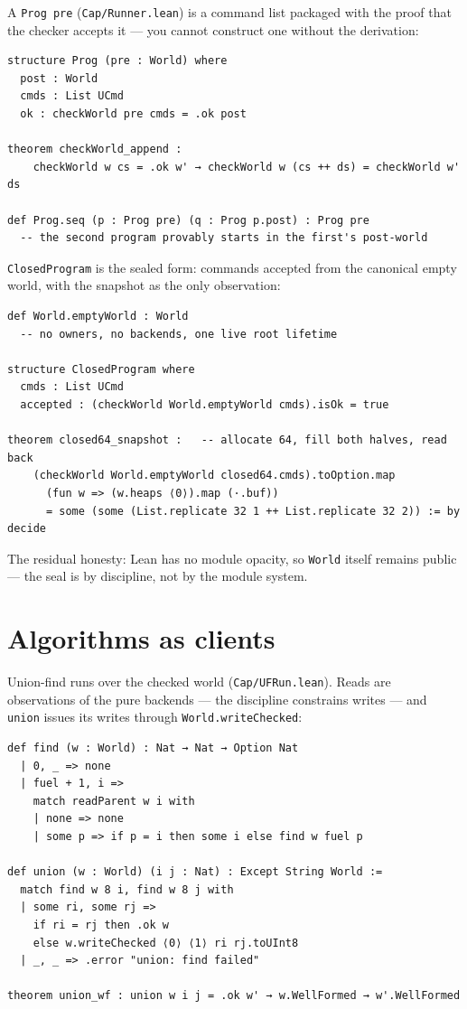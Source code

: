 \documentclass[10pt,a4paper]{article}
\newcommand{\file}[1]{\texttt{#1}}
\newcommand{\lean}[1]{\texttt{#1}}
\begin{document}
A \lean{Prog pre} (\file{Cap/Runner.lean}) is a command list packaged with the
proof that the checker accepts it --- you cannot construct one without the
derivation:

\begin{lstlisting}
structure Prog (pre : World) where
  post : World
  cmds : List UCmd
  ok : checkWorld pre cmds = .ok post

theorem checkWorld_append :
    checkWorld w cs = .ok w' → checkWorld w (cs ++ ds) = checkWorld w' ds

def Prog.seq (p : Prog pre) (q : Prog p.post) : Prog pre
  -- the second program provably starts in the first's post-world
\end{lstlisting}

\lean{ClosedProgram} is the sealed form: commands accepted from the canonical
empty world, with the snapshot as the only observation:

\begin{lstlisting}
def World.emptyWorld : World
  -- no owners, no backends, one live root lifetime

structure ClosedProgram where
  cmds : List UCmd
  accepted : (checkWorld World.emptyWorld cmds).isOk = true

theorem closed64_snapshot :   -- allocate 64, fill both halves, read back
    (checkWorld World.emptyWorld closed64.cmds).toOption.map
      (fun w => (w.heaps ⟨0⟩).map (·.buf))
      = some (some (List.replicate 32 1 ++ List.replicate 32 2)) := by decide
\end{lstlisting}

The residual honesty: Lean has no module opacity, so \lean{World} itself remains
public --- the seal is by discipline, not by the module system.

\section{Algorithms as clients}

Union-find runs over the checked world (\file{Cap/UFRun.lean}). Reads are
observations of the pure backends --- the discipline constrains writes --- and
\lean{union} issues its writes through \lean{World.writeChecked}:

\begin{lstlisting}
def find (w : World) : Nat → Nat → Option Nat
  | 0, _ => none
  | fuel + 1, i =>
    match readParent w i with
    | none => none
    | some p => if p = i then some i else find w fuel p

def union (w : World) (i j : Nat) : Except String World :=
  match find w 8 i, find w 8 j with
  | some ri, some rj =>
    if ri = rj then .ok w
    else w.writeChecked ⟨0⟩ ⟨1⟩ ri rj.toUInt8
  | _, _ => .error "union: find failed"

theorem union_wf : union w i j = .ok w' → w.WellFormed → w'.WellFormed
\end{lstlisting}
\end{document}
